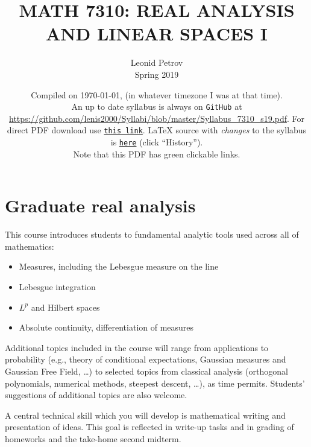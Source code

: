 \documentclass[oneside,11pt]{amsart}
\begin{document}
\title[MATH 7310: REAL ANALYSIS AND LINEAR SPACES I]{MATH 7310: REAL ANALYSIS AND LINEAR SPACES I}
\author{Leonid Petrov\\Spring 2019}
\date{Compiled on \today, \currenttime{} (in whatever timezone I was at that time).\\An up to date syllabus is always on \texttt{GitHub} at \url{https://github.com/lenis2000/Syllabi/blob/master/Syllabus_7310_s19.pdf}. For direct PDF download use \href{https://github.com/lenis2000/Syllabi/raw/master/Syllabus_7310_s19.pdf}{\texttt{this link}}.
	\LaTeX{} source with \textit{changes} to the syllabus is \href{https://github.com/lenis2000/Syllabi/blob/master/Syllabus_7310_s19.tex}{\texttt{here}}
(click ``History'').
\\Note that this PDF has green clickable links.}
\maketitle

\bigskip

\section{Graduate real analysis}
\bigskip

This course introduces students to fundamental analytic tools used across all of mathematics:
\begin{itemize}
	\item Measures, including the Lebesgue measure on the line
	\item Lebesgue integration
	\item $L^p$ and Hilbert spaces
	\item Absolute continuity, differentiation of measures
\end{itemize}

Additional topics included in the course will range from applications to 
probability (e.g., theory of conditional expectations, Gaussian measures and Gaussian Free Field, \ldots)
to selected topics from classical analysis (orthogonal polynomials, numerical methods, steepest descent, \ldots),
as time permits.
Students' suggestions of additional topics are also welcome.

A central technical skill which you will develop is mathematical writing
and presentation of ideas. This goal is reflected in write-up tasks and 
in grading of homeworks and the take-home second midterm.
\end{document}
